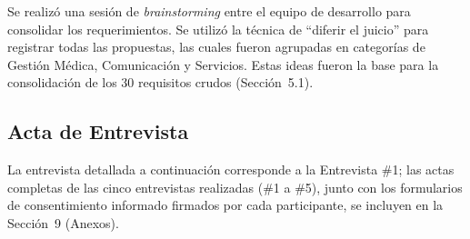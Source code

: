 \documentclass[journal,onecolumn]{IEEEtran}
\begin{document}
Se realizó una sesión de \textit{brainstorming} entre el equipo de
desarrollo para consolidar los requerimientos. Se utilizó la técnica de
``diferir el juicio'' para registrar todas las propuestas, las cuales fueron
agrupadas en categorías de Gestión Médica, Comunicación y Servicios. Estas
ideas fueron la base para la consolidación de los 30 requisitos crudos
(Sección~5.1).

\subsection{Acta de Entrevista}

La entrevista detallada a continuación corresponde a la Entrevista \#1; las
actas completas de las cinco entrevistas realizadas (\#1 a \#5), junto con
los formularios de consentimiento informado firmados por cada participante,
se incluyen en la Sección~9 (Anexos).
\end{document}
